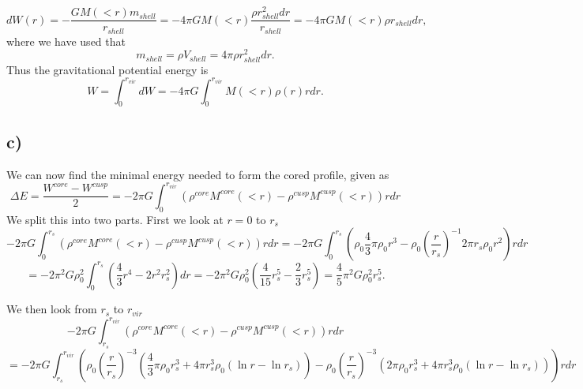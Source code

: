 \documentclass[a4paper,norsk, 10pt]{article}
\begin{document}
\begin{equation}
dW(r) = -\frac{GM(<r)m_{shell}}{r_{shell}} = -4\pi G M(<r) \dfrac{\rho r_{shell}^2 dr}{r_{shell}} = -4\pi G M(<r) \rho r_{shell} dr,
\end{equation}
where we have used that 
\begin{equation}
m_{shell} = \rho V_{shell} = 4\pi \rho r_{shell}^2 dr.
\end{equation}
Thus the gravitational potential energy is
\begin{equation}
W = \int_0^{r_{vir}} dW = -4\pi G \int_0^{r_{vir}} M(<r) \rho(r) r dr.
\end{equation}


\subsection{c)}
We can now find the minimal energy needed to form the cored profile, given as 
\begin{equation}
\Delta E = \dfrac{W^{core} - W^{cusp}}{2} = -2\pi G\int_0^{r_{vir}} \left(\rho^{core}M^{core}(<r) - \rho^{cusp}M^{cusp}(<r)\right) r dr
\end{equation}
We split this into two parts. First we look at $r=0$ to $r_s$
\begin{equation}
-2\pi G \int_0^{r_{s}} \left(\rho^{core}M^{core}(<r) - \rho^{cusp}M^{cusp}(<r)\right) r dr = -2\pi G\int_0^{r_{s}} \left(\rho_0\dfrac{4}{3}\pi \rho_0 r^3 - \rho_0\left(\dfrac{r}{r_s}\right)^{-1}2\pi r_s \rho_0 r^2\right) r dr 
\end{equation}
\begin{equation}
= -2\pi^2G \rho_0^2 \int_0^{r_{s}}( \frac{4}{3}r^4 - 2r^2 r_s^2)dr = -2\pi^2G \rho_0^2 ( \frac{4}{15}r_s^5 - \frac{2}{3} r_s^5) = \frac{4}{5}\pi^2G \rho_0^2 r_s^5.
\end{equation}

We then look from $r_s$ to $r_{vir}$
\begin{equation}
-2\pi G \int_{r_s}^{r_{vir}} \left(\rho^{core}M^{core}(<r) - \rho^{cusp}M^{cusp}(<r)\right) r dr 
\end{equation}
\begin{equation}
= -2\pi G \int_{r_s}^{r_{vir}} \left(\rho_0\left(\dfrac{r}{r_s}\right)^{-3}\left( \dfrac{4}{3}\pi \rho_0 r_s^3 + 4\pi r_s^3 \rho_0 (\ln r - \ln r_s)\right) -  \rho_0\left(\dfrac{r}{r_s}\right)^{-3}\left(2\pi  \rho_0 r_s^3 +  4\pi r_s^3 \rho_0 (\ln r - \ln r_s)\right) \right)r dr 
\end{equation}
\end{document}
